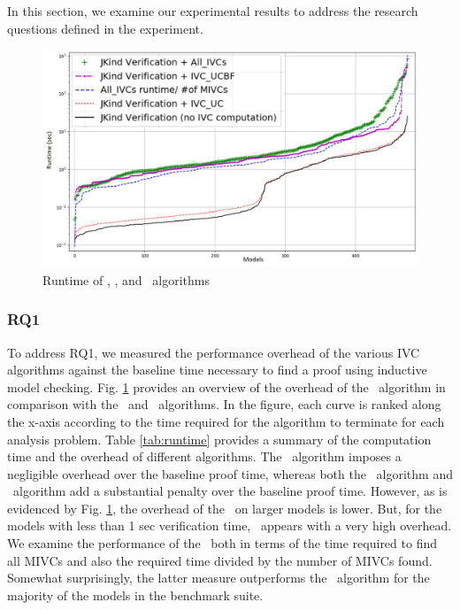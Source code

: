 

In this section, we examine our
experimental results to address the research questions defined in the experiment.

\begin{figure}
 \centering
  \includegraphics[width=\columnwidth]{figs/performance.jpg}
  \vspace{-0.2in}
  \caption{Runtime of \aivcalg, \ucbfalg, and \ucalg ~algorithms}
  \label{fig:performance}
  \vspace{-0.2in}
\end{figure}

\subsubsection{RQ1}

To address RQ1, we measured the performance overhead of the various IVC algorithms against the baseline time
necessary to find a proof using inductive model checking. Fig. \ref{fig:performance} provides an overview of the  overhead of the \aivcalg ~algorithm in comparison with the \ucalg ~and \ucbfalg\ algorithms.  In the figure, each curve is ranked along the x-axis according to the time required for the algorithm to terminate for each analysis problem.
Table \ref{tab:runtime} provides a summary of the computation time and the overhead of different algorithms.
  The \ucalg\  algorithm imposes a negligible overhead over the baseline proof time,
   whereas both the \ucbfalg\ algorithm and \aivcalg\
   algorithm add a substantial penalty over the baseline proof time. However, as is evidenced by Fig. \ref{fig:performance}, the overhead of the \aivcalg\ on larger models is lower. But, for the models with less than 1 sec verification time, \aivcalg\ appears with a very high overhead.
    We examine the performance of the \aivcalg\ both
     in terms of the time required to find all MIVCs and also the required time divided by the number of MIVCs found.  Somewhat surprisingly, the latter measure outperforms the \ucbfalg\ algorithm for the majority of the models in the benchmark suite.

